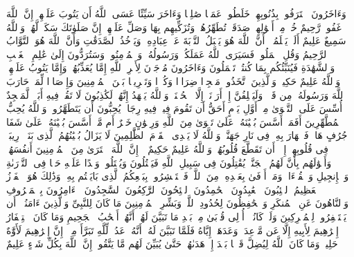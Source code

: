 \stopbuffer%
\startbuffer[\q:9:102]
وَءَاخَرُونَ ٱعۡتَرَفُوا۟ بِذُنُوبِهِمۡ خَلَطُوا۟ عَمَلࣰا صَٰلِحࣰا وَءَاخَرَ سَیِّئًا عَسَى ٱللَّهُ أَن یَتُوبَ عَلَیۡهِمۡۚ إِنَّ ٱللَّهَ غَفُورࣱ رَّحِیمٌ%
\stopbuffer%
\startbuffer[\q:9:103]
خُذۡ مِنۡ أَمۡوَٰلِهِمۡ صَدَقَةࣰ تُطَهِّرُهُمۡ وَتُزَكِّیهِم بِهَا وَصَلِّ عَلَیۡهِمۡۖ إِنَّ صَلَوٰتَكَ سَكَنࣱ لَّهُمۡۗ وَٱللَّهُ سَمِیعٌ عَلِیمٌ%
\stopbuffer%
\startbuffer[\q:9:104]
أَلَمۡ یَعۡلَمُوۤا۟ أَنَّ ٱللَّهَ هُوَ یَقۡبَلُ ٱلتَّوۡبَةَ عَنۡ عِبَادِهِۦ وَیَأۡخُذُ ٱلصَّدَقَٰتِ وَأَنَّ ٱللَّهَ هُوَ ٱلتَّوَّابُ ٱلرَّحِیمُ%
\stopbuffer%
\startbuffer[\q:9:105]
وَقُلِ ٱعۡمَلُوا۟ فَسَیَرَى ٱللَّهُ عَمَلَكُمۡ وَرَسُولُهُۥ وَٱلۡمُؤۡمِنُونَۖ وَسَتُرَدُّونَ إِلَىٰ عَٰلِمِ ٱلۡغَیۡبِ وَٱلشَّهَٰدَةِ فَیُنَبِّئُكُم بِمَا كُنتُمۡ تَعۡمَلُونَ%
\stopbuffer%
\startbuffer[\q:9:106]
وَءَاخَرُونَ مُرۡجَوۡنَ لِأَمۡرِ ٱللَّهِ إِمَّا یُعَذِّبُهُمۡ وَإِمَّا یَتُوبُ عَلَیۡهِمۡۗ وَٱللَّهُ عَلِیمٌ حَكِیمࣱ%
\stopbuffer%
\startbuffer[\q:9:107]
وَٱلَّذِینَ ٱتَّخَذُوا۟ مَسۡجِدࣰا ضِرَارࣰا وَكُفۡرࣰا وَتَفۡرِیقَۢا بَیۡنَ ٱلۡمُؤۡمِنِینَ وَإِرۡصَادࣰا لِّمَنۡ حَارَبَ ٱللَّهَ وَرَسُولَهُۥ مِن قَبۡلُۚ وَلَیَحۡلِفُنَّ إِنۡ أَرَدۡنَاۤ إِلَّا ٱلۡحُسۡنَىٰۖ وَٱللَّهُ یَشۡهَدُ إِنَّهُمۡ لَكَٰذِبُونَ%
\stopbuffer%
\startbuffer[\q:9:108]
لَا تَقُمۡ فِیهِ أَبَدࣰاۚ لَّمَسۡجِدٌ أُسِّسَ عَلَى ٱلتَّقۡوَىٰ مِنۡ أَوَّلِ یَوۡمٍ أَحَقُّ أَن تَقُومَ فِیهِۚ فِیهِ رِجَالࣱ یُحِبُّونَ أَن یَتَطَهَّرُوا۟ۚ وَٱللَّهُ یُحِبُّ ٱلۡمُطَّهِّرِینَ%
\stopbuffer%
\startbuffer[\q:9:109]
أَفَمَنۡ أَسَّسَ بُنۡیَٰنَهُۥ عَلَىٰ تَقۡوَىٰ مِنَ ٱللَّهِ وَرِضۡوَٰنٍ خَیۡرٌ أَم مَّنۡ أَسَّسَ بُنۡیَٰنَهُۥ عَلَىٰ شَفَا جُرُفٍ هَارࣲ فَٱنۡهَارَ بِهِۦ فِی نَارِ جَهَنَّمَۗ وَٱللَّهُ لَا یَهۡدِی ٱلۡقَوۡمَ ٱلظَّٰلِمِینَ%
\stopbuffer%
\startbuffer[\q:9:110]
لَا یَزَالُ بُنۡیَٰنُهُمُ ٱلَّذِی بَنَوۡا۟ رِیبَةࣰ فِی قُلُوبِهِمۡ إِلَّاۤ أَن تَقَطَّعَ قُلُوبُهُمۡۗ وَٱللَّهُ عَلِیمٌ حَكِیمٌ%
\stopbuffer%
\startbuffer[\q:9:111]
۞ إِنَّ ٱللَّهَ ٱشۡتَرَىٰ مِنَ ٱلۡمُؤۡمِنِینَ أَنفُسَهُمۡ وَأَمۡوَٰلَهُم بِأَنَّ لَهُمُ ٱلۡجَنَّةَۚ یُقَٰتِلُونَ فِی سَبِیلِ ٱللَّهِ فَیَقۡتُلُونَ وَیُقۡتَلُونَۖ وَعۡدًا عَلَیۡهِ حَقࣰّا فِی ٱلتَّوۡرَىٰةِ وَٱلۡإِنجِیلِ وَٱلۡقُرۡءَانِۚ وَمَنۡ أَوۡفَىٰ بِعَهۡدِهِۦ مِنَ ٱللَّهِۚ فَٱسۡتَبۡشِرُوا۟ بِبَیۡعِكُمُ ٱلَّذِی بَایَعۡتُم بِهِۦۚ وَذَٰلِكَ هُوَ ٱلۡفَوۡزُ ٱلۡعَظِیمُ%
\stopbuffer%
\startbuffer[\q:9:112]
ٱلتَّٰۤئِبُونَ ٱلۡعَٰبِدُونَ ٱلۡحَٰمِدُونَ ٱلسَّٰۤئِحُونَ ٱلرَّٰكِعُونَ ٱلسَّٰجِدُونَ ٱلۡءَامِرُونَ بِٱلۡمَعۡرُوفِ وَٱلنَّاهُونَ عَنِ ٱلۡمُنكَرِ وَٱلۡحَٰفِظُونَ لِحُدُودِ ٱللَّهِۗ وَبَشِّرِ ٱلۡمُؤۡمِنِینَ%
\stopbuffer%
\startbuffer[\q:9:113]
مَا كَانَ لِلنَّبِیِّ وَٱلَّذِینَ ءَامَنُوۤا۟ أَن یَسۡتَغۡفِرُوا۟ لِلۡمُشۡرِكِینَ وَلَوۡ كَانُوۤا۟ أُو۟لِی قُرۡبَىٰ مِنۢ بَعۡدِ مَا تَبَیَّنَ لَهُمۡ أَنَّهُمۡ أَصۡحَٰبُ ٱلۡجَحِیمِ%
\stopbuffer%
\startbuffer[\q:9:114]
وَمَا كَانَ ٱسۡتِغۡفَارُ إِبۡرَٰهِیمَ لِأَبِیهِ إِلَّا عَن مَّوۡعِدَةࣲ وَعَدَهَاۤ إِیَّاهُ فَلَمَّا تَبَیَّنَ لَهُۥۤ أَنَّهُۥ عَدُوࣱّ لِّلَّهِ تَبَرَّأَ مِنۡهُۚ إِنَّ إِبۡرَٰهِیمَ لَأَوَّٰهٌ حَلِیمࣱ%
\stopbuffer%
\startbuffer[\q:9:115]
وَمَا كَانَ ٱللَّهُ لِیُضِلَّ قَوۡمَۢا بَعۡدَ إِذۡ هَدَىٰهُمۡ حَتَّىٰ یُبَیِّنَ لَهُم مَّا یَتَّقُونَۚ إِنَّ ٱللَّهَ بِكُلِّ شَیۡءٍ عَلِیمٌ%
\stopbuffer%

